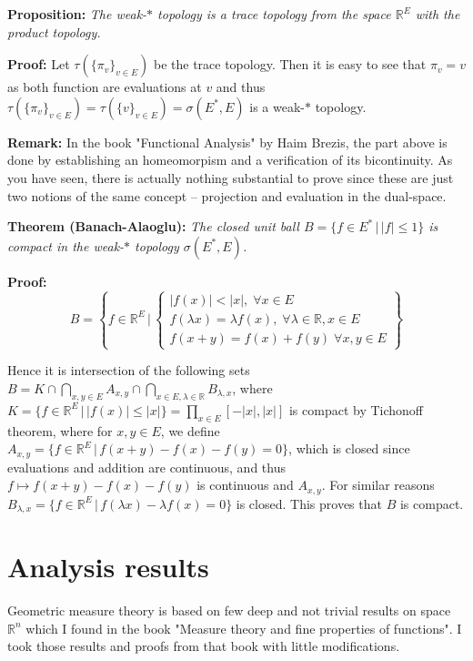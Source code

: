 \documentclass{article}
\begin{document}
\vspace{1ex}
\textbf{Proposition:} \textit{The weak-$*$ topology is a trace topology from the space
$\mathbb{R}^E$ with the product topology.}

\vspace{1ex}
\textbf{Proof:} Let $\tau(\{\pi_v\}_{v\in E})$ be the trace topology. Then it
is easy to see that $\pi_v=v$ as both function are evaluations at $v$ and thus
$\tau(\{\pi_v\}_{v\in E})=\tau(\{v\}_{v\in E})=\sigma(E^*, E)$ is a weak-$*$
topology.

\vspace{1ex}
\textbf{Remark:} In the book "Functional Analysis" by Haim Brezis, the part
above is done by establishing an homeomorpism and a verification of its bicontinuity.
As you have seen, there is actually nothing substantial to prove since these are 
just two notions of the same concept – projection and evaluation in the dual-space.

\vspace{1ex}
\textbf{Theorem (Banach-Alaoglu):} \textit{The closed unit ball $B=\{f\in E^*\,|\,|
f|\leq 1\}$ is compact in the weak-$*$ topology $\sigma(E^*, E)$.}

\vspace{1ex}
\textbf{Proof:}
\[ B=\left\{f\in\mathbb{R}^E\,|\,
\begin{cases}
    |f(x)|<|x|,\;\forall x\in E\\
    f(\lambda x)=\lambda f(x),\;\forall\lambda\in\mathbb{R}, x\in E\\
    f(x+y)=f(x)+f(y)\;\forall x,y\in E
\end{cases}
\right\} \] 

Hence it is intersection of the following sets $B=K\cap\bigcap_{x,y\in E} A_{x,y}
\cap\bigcap_{x\in E, \lambda\in\mathbb{R}}B_{\lambda,x}$, where $K=\{f\in\mathbb
{R}^E\,|\,|f(x)|\leq|x|\}=\prod_{x\in E}[-|x|, |x|]$ is compact by Tichonoff
theorem, where for $x,y\in E$, we define $A_{x,y}=\{f\in\mathbb{R}^E\,|\,f(x+y)-
f(x)-f(y)=0\}$, which is closed since evaluations and addition are continuous, and
thus $f\mapsto f(x+y)-f(x)-f(y)$ is continuous and $A_{x,y}$. For similar
reasons $B_{\lambda, x}=\{f\in\mathbb{R}^E\,|\,f(\lambda x)-\lambda f(x)=0\}$ is
closed. This proves that $B$ is compact.

\section{Analysis results}

Geometric measure theory is based on few deep and not trivial results on space
$\mathbb{R}^n$ which I found in the book "Measure theory and fine properties
of functions". I took those results and proofs from that book with little
modifications.
\end{document}
